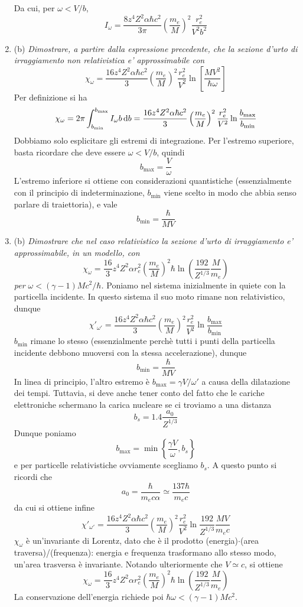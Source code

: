 \documentclass{article}
\renewcommand{\b}{(b)}
\renewcommand{\t}[1]{\textit{ #1}}
\begin{document}
\begin{enumerate}
		Da cui, per $\omega<V/b$,
		\[I_\omega=\frac{8z^4Z^2\alpha\hbar c^2}{3\pi}\left(\frac{m_e}{M}\right)^2\frac{r_e^2}{V^2b^2}\]
	\item\b\t{Dimostrare, a partire dalla espressione precedente, che la sezione d’urto di
		irraggiamento non relativistica e' approssimabile con \[\chi_\omega=\frac{16z^4Z^2\alpha\hbar c^2}{3}\left(\frac{m_e}{M}\right)^2\frac{r_e^2}{V^2}\ln\left[\frac{MV^2}{\hbar\omega}\right]\]}
	Per definizione si ha
	\[\chi_\omega=2\pi\int_{b_\textrm{min}}^{b_\textrm{max}}I_\omega b\,\mathrm{d} b=\frac{16z^4Z^2\alpha\hbar c^2}{3}\left(\frac{m_e}{M}\right)^2\frac{r_e^2}{V^2}\ln\frac{b_\textrm{max}}{b_\textrm{min}}\]
	Dobbiamo solo esplicitare gli estremi di integrazione. Per l'estremo superiore, basta ricordare che deve essere $\omega<V/b$, quindi
	\[b_\textrm{max}=\frac{V}{\omega}\]
	L'estremo inferiore si ottiene con considerazioni quantistiche (essenzialmente con il principio di indeterminazione, $b_\textrm{min}$ viene scelto in modo che abbia senso parlare di traiettoria), e vale
	\[b_\textrm{min}=\frac{\hbar}{MV}\]
	\item\b\t{Dimostrare che nel caso relativistico la sezione d’urto di irraggiamento e'
		approssimabile, in un modello, con \[\chi_\omega=\frac{16}{3}z^4Z^2\alpha r_e^2\left(\frac{m_e}{M}\right)^2\hbar\ln\left(\frac{192}{Z^{1/3}}\frac{M}{m_e}\right)\] per
		$\omega < (\gamma-1)Mc^2/\hbar$.}
	Poniamo nel sistema inizialmente in quiete con la particella incidente. In questo sistema il suo moto rimane non relativistico, dunque
	\[\chi'_{\omega'}=\frac{16z^4Z^2\alpha\hbar c^2}{3}\left(\frac{m_e}{M}\right)^2\frac{r_e^2}{V^2}\ln\frac{b_\textrm{max}}{b_\textrm{min}}\]
	$b_\textrm{min}$ rimane lo stesso (essenzialmente perchè tutti i punti della particella incidente debbono muoversi con la stessa accelerazione), dunque
	\[b_\textrm{min}=\frac{\hbar}{MV}\]
	In linea di principio, l'altro estremo è $b_\textrm{max}=\gamma V/\omega'$ a causa della dilatazione dei tempi. Tuttavia, si deve anche tener conto del fatto che le cariche elettroniche schermano la carica nucleare se ci troviamo a una distanza
	\[b_s=1.4\frac{a_0}{Z^{1/3}}\]
	Dunque poniamo
	\[b_\textrm{max}=\min\left\{\frac{\gamma V}{\omega},b_s\right\}\]
	e per particelle relativistiche ovviamente scegliamo $b_s$. A questo punto si ricordi che
	\[a_0=\frac{\hbar}{m_ec\alpha}\simeq\frac{137\hbar}{m_ec}\]
	da cui si ottiene infine
	\[\chi'_{\omega'}=\frac{16z^4Z^2\alpha\hbar c^2}{3}\left(\frac{m_e}{M}\right)^2\frac{r_e^2}{V^2}\ln\frac{192}{Z^{1/3}}\frac{MV}{m_ec}\]
	$\chi_\omega$ è un'invariante di Lorentz, dato che è il prodotto (energia)$\cdot$(area traversa)/(frequenza): energia e frequenza trasformano allo stesso modo, un'area trasversa è invariante. Notando ulteriormente che $V\simeq c$, si ottiene
	\[\chi_\omega=\frac{16}{3}z^4Z^2\alpha r_e^2\left(\frac{m_e}{M}\right)^2\hbar\ln\left(\frac{192}{Z^{1/3}}\frac{M}{m_e}\right)\]
	La conservazione dell'energia richiede poi $\hbar\omega<(\gamma-1)Mc^2$.
	

\end{enumerate}
\end{document}
